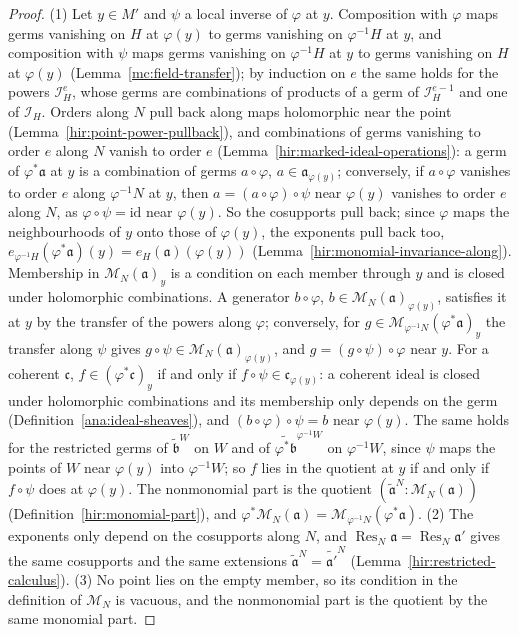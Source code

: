 \begin{proof}
\leanok
(1) Let \(y\in M'\) and \(\psi\) a local inverse of \(\varphi\) at \(y\). Composition with \(\varphi\) maps germs vanishing on \(H\) at \(\varphi(y)\) to germs vanishing on
\(\varphi^{-1}H\) at \(y\), and composition with \(\psi\) maps germs vanishing on \(\varphi^{-1}H\) at \(y\) to germs vanishing on \(H\) at \(\varphi(y)\)
(Lemma~\ref{mc:field-transfer}); by induction on \(e\) the same holds for the powers \(\mathcal I_H^e\), whose germs are combinations of products of a germ of
\(\mathcal I_H^{e-1}\) and one of \(\mathcal I_H\). Orders along \(N\) pull back along maps holomorphic near the point (Lemma~\ref{hir:point-power-pullback}), and
combinations of germs vanishing to order \(e\) along \(N\) vanish to order \(e\) (Lemma~\ref{hir:marked-ideal-operations}): a germ of \(\varphi^*\mathfrak a\) at \(y\) is a
combination of germs \(a\circ\varphi\), \(a\in\mathfrak a_{\varphi(y)}\); conversely, if \(a\circ\varphi\) vanishes to order \(e\) along \(\varphi^{-1}N\) at \(y\), then
\(a=(a\circ\varphi)\circ\psi\) near \(\varphi(y)\) vanishes to order \(e\) along \(N\), as \(\varphi\circ\psi=\mathrm{id}\) near \(\varphi(y)\). So the cosupports pull back; since
\(\varphi\) maps the neighbourhoods of \(y\) onto those of \(\varphi(y)\), the exponents pull back too, \(e_{\varphi^{-1}H}(\varphi^*\mathfrak a)(y)=e_H(\mathfrak a)(\varphi(y))\)
(Lemma~\ref{hir:monomial-invariance-along}). Membership in \(\mathcal M_N(\mathfrak a)_y\) is a condition on each member through \(y\) and is closed under holomorphic
combinations. A generator \(b\circ\varphi\), \(b\in\mathcal M_N(\mathfrak a)_{\varphi(y)}\), satisfies it at \(y\) by the transfer of the powers along \(\varphi\); conversely,
for \(g\in\mathcal M_{\varphi^{-1}N}(\varphi^*\mathfrak a)_y\) the transfer along \(\psi\) gives \(g\circ\psi\in\mathcal M_N(\mathfrak a)_{\varphi(y)}\), and \(g=(g\circ\psi)\circ\varphi\)
near \(y\). For a coherent \(\mathfrak c\), \(f\in(\varphi^*\mathfrak c)_y\) if and only if \(f\circ\psi\in\mathfrak c_{\varphi(y)}\): a coherent ideal is closed under holomorphic
combinations and its membership only depends on the germ (Definition~\ref{ana:ideal-sheaves}), and \((b\circ\varphi)\circ\psi=b\) near \(\varphi(y)\). The same holds for the
restricted germs of \(\widetilde{\mathfrak b}^W\) on \(W\) and of \(\widetilde{\varphi^*\mathfrak b}^{\varphi^{-1}W}\) on \(\varphi^{-1}W\), since \(\psi\) maps the points of
\(W\) near \(\varphi(y)\) into \(\varphi^{-1}W\); so \(f\) lies in the quotient at \(y\) if and only if \(f\circ\psi\) does at \(\varphi(y)\). The nonmonomial part is the quotient
\((\widetilde{\mathfrak a}^N:\mathcal M_N(\mathfrak a))\) (Definition~\ref{hir:monomial-part}), and \(\varphi^*\mathcal M_N(\mathfrak a)=\mathcal M_{\varphi^{-1}N}(\varphi^*\mathfrak a)\).
(2) The exponents only depend on the cosupports along \(N\), and \(\operatorname{Res}_N\mathfrak a=\operatorname{Res}_N\mathfrak a'\) gives the same cosupports and the same
extensions \(\widetilde{\mathfrak a}^N=\widetilde{\mathfrak a'}^N\) (Lemma~\ref{hir:restricted-calculus}). (3) No point lies on the empty member, so its condition in the
definition of \(\mathcal M_N\) is vacuous, and the nonmonomial part is the quotient by the same monomial part.
\end{proof}

